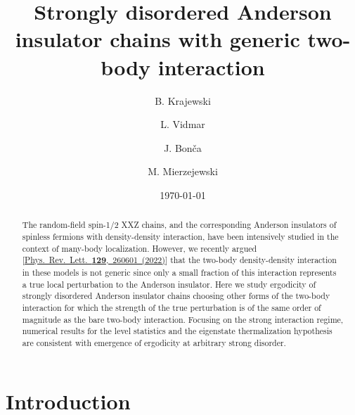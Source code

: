 \documentclass[twocolumn,pre,superscriptaddress,10pt,aps,floatfix]{revtex4-1}
\newcommand{\stoptocentries}{\renewcommand{\addcontentsline}[3]{}}
\begin{document}
\title{Strongly disordered Anderson insulator chains with generic two-body interaction}
\author{B. Krajewski}
\author{L. Vidmar}
\author{J. Bon\v ca}
\author{M. Mierzejewski}
\date{\today}
\begin{abstract}
The random-field spin-1/2 XXZ chains, and the corresponding Anderson insulators of spinless fermions with density-density interaction, have been intensively studied in the context of many-body localization. However, we recently argued [\href{https://doi.org/10.1103/PhysRevLett.129.260601}{Phys.~Rev.~Lett.~{\bf 129},~260601~(2022)}] that the two-body density-density interaction in these models is not generic since only a small fraction of this interaction represents a true local perturbation to the Anderson insulator.
Here we study ergodicity of strongly disordered Anderson insulator chains choosing other forms of the two-body interaction for which the strength of the true perturbation is of the same order of magnitude as the bare two-body interaction. Focusing on the strong interaction regime, numerical results for the level statistics and the eigenstate thermalization hypothesis are consistent with emergence of ergodicity at arbitrary strong disorder.
  
\end{abstract}
\maketitle
\stoptocentries

\section{Introduction}
\end{document}

